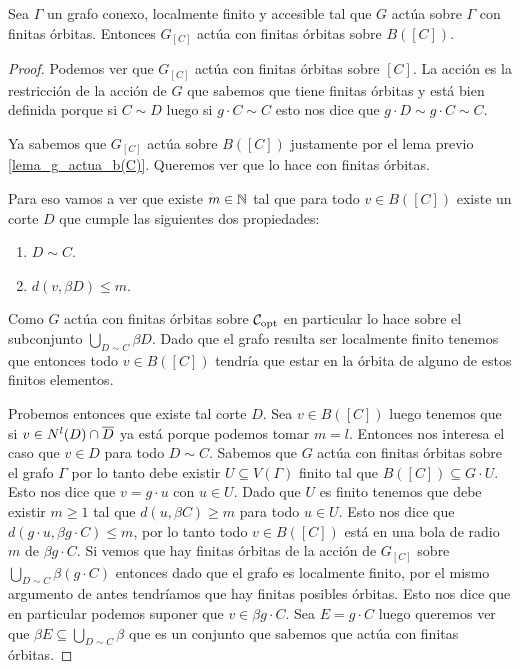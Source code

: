 \documentclass[tesis.tex]{subfiles}
\begin{document}
\begin{lema}\label{lema_accion_b(C)}
	Sea $\Gamma$ un grafo conexo, localmente finito y accesible tal que $G$ actúa sobre $\Gamma$ con finitas órbitas.
	Entonces $G_{[C]}$ actúa con finitas órbitas sobre $B([C])$.
\end{lema}
\begin{proof}
	Podemos ver que $G_{[C]}$ actúa con finitas órbitas sobre $[C]$.
	La acción es la restricción de la acción de $G$ que sabemos que tiene finitas órbitas y está bien definida porque si $C \sim D$ luego si $g \cdot C \sim C$ esto nos dice que $g \cdot D \sim g \cdot C \sim C$.
	
	Ya sabemos que $G_{[C]}$ actúa sobre $B([C])$ justamente por el lema previo \ref{lema_g_actua_b(C)}.
	Queremos ver que lo hace con finitas órbitas.
	
	Para eso vamos a ver que existe $m \in \mathbb{N}$ tal que para todo $v \in B([C])$ existe un corte $D$ que cumple las siguientes dos propiedades:
	\begin{enumerate}
		\item $D \sim C$.
		\item $d(v,\beta D) \le m$.
	\end{enumerate}
	
	Como $G$ actúa con finitas órbitas sobre ${\cal C}_{\text{opt}}$ en particular lo hace sobre el subconjunto $\bigcup_{D \sim C} \beta D$.
	Dado que el grafo resulta ser localmente finito tenemos que entonces todo $v \in B([C])$ tendría que estar en la órbita de alguno de estos finitos elementos.
	
	Probemos entonces que existe tal corte $D$.
	Sea $v \in B([C])$ luego tenemos que si $v \in N^l(D) \cap \overline D$ ya está porque podemos tomar $m=l$.
	Entonces nos interesa el caso que $v \in D$ para todo $D \sim C$.
	Sabemos que $G$ actúa con finitas órbitas sobre el grafo $\Gamma$ por lo tanto debe existir $U \subseteq V(\Gamma)$ finito tal que $B([C]) \subseteq G \cdot U$.
	Esto nos dice que $v = g \cdot u$ con $u \in U$.
	Dado que $U$ es finito tenemos que debe existir $m \ge 1$ tal que $d(u,\beta C) \ge m$ para todo $u \in U$.
	Esto nos dice que $d(g \cdot u, \beta g \cdot C) \le m$, por lo tanto todo $v \in B([C])$ está en una bola de radio $m$ de $\beta g \cdot C$.
	Si vemos que hay finitas órbitas de la acción de $G_{[C]}$ sobre $\bigcup_{D \sim C} \beta (g \cdot C)$ entonces dado que el grafo es localmente finito, por el mismo argumento de antes tendríamos que hay finitas posibles órbitas.
	Esto nos dice que en particular podemos suponer que $v \in \beta g \cdot C$.
	Sea $E = g \cdot C$ luego queremos ver que $\beta E \subseteq \bigcup_{D \sim C} \beta $ que es un conjunto que sabemos que actúa con finitas órbitas.
	

\end{proof}
\end{document}
